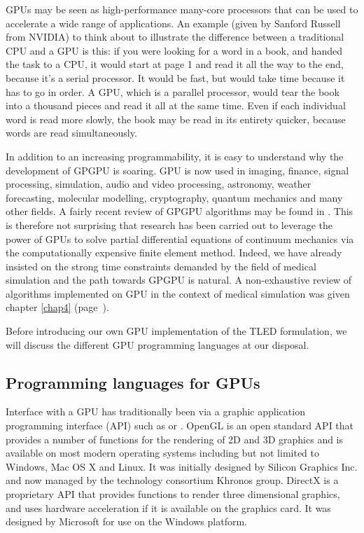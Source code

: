 \bigskip

GPUs may be seen as high-performance many-core processors that can be used to accelerate a wide range of applications. An example (given by Sanford Russell from NVIDIA) to think about to illustrate the difference between a traditional CPU and a GPU is this: if you were looking for a word in a book, and handed the task to a CPU, it would start at page 1 and read it all the way to the end, because it's a serial processor. It would be fast, but would take time because it has to go in order. A GPU, which is a parallel processor, would tear the book into a thousand pieces and read it all at the same time. Even if each individual word is read more slowly, the book may be read in its entirety quicker, because words are read simultaneously. 

In addition to an increasing programmability, it is easy to understand why the development of GPGPU is soaring. GPU is now used in imaging, finance, signal processing, simulation, audio and video processing, astronomy, weather forecasting, molecular modelling, cryptography, quantum mechanics and many other fields. A fairly recent review of GPGPU algorithms may be found in \cite{Owens07}. This is therefore not surprising that research has been carried out to leverage the power of GPUs to solve partial differential equations of continuum mechanics via the computationally expensive finite element method. Indeed, we have already insisted on the strong time constraints demanded by the field of medical simulation and the path towards GPGPU is natural. A non-exhaustive review of algorithms implemented on GPU in the context of medical simulation was given chapter \ref{chap4} (page~\pageref{chap4:GPUMedicalSimulation}). 

Before introducing our own GPU implementation of the TLED formulation, we will discuss the different GPU programming languages at our disposal. 


	\subsection{Programming languages for GPUs}

Interface with a GPU has traditionally been via a graphic application programming interface (API) such as  or . OpenGL is an open standard API that provides a number of functions for the rendering of 2D and 3D graphics and is available on most modern operating systems including but not limited to Windows, Mac OS X and Linux. It was initially designed by Silicon Graphics Inc. and now managed by the technology consortium Khronos group. DirectX is a proprietary API that provides functions to render three dimensional graphics, and uses hardware acceleration if it is available on the graphics card. It was designed by Microsoft for use on the Windows platform. 

